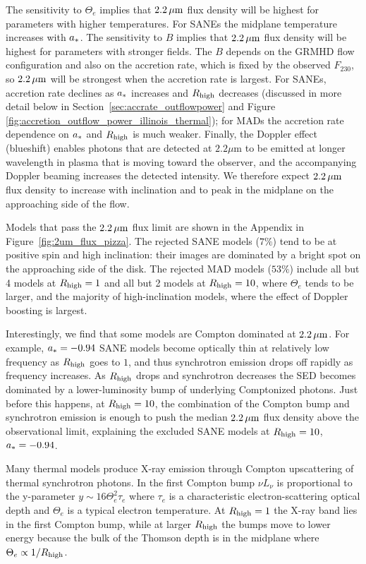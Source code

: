 The sensitivity to $\Theta_e$ implies that $2.2\,\mu\mathrm{m}$ flux density will be highest for parameters with higher temperatures.
For SANEs the midplane temperature increases with $a_*$.
The sensitivity to $B$ implies that $2.2\,\mu\mathrm{m}$ flux density will be highest for parameters with stronger fields.
The $B$ depends on the GRMHD flow configuration and also on the accretion rate, which is fixed by the observed $F_{230}$, so $2.2\,\mu\mathrm{m}$ will be strongest when the accretion rate is largest.
For SANEs, accretion rate declines as $a_*$ increases and $R_\mathrm{high}$ decreases (discussed in more detail below in  Section~\ref{sec:accrate_outflowpower} and Figure \ref{fig:accretion_outflow_power_illinois_thermal}); for MADs the accretion rate dependence on $a_*$ and $R_\mathrm{high}$ is much weaker.
Finally, the Doppler effect (blueshift) enables photons that are detected at $2.2\mu$m to be emitted at longer wavelength in plasma that is moving toward the observer, and the accompanying Doppler beaming increases the detected intensity.
We therefore expect $2.2\,\mu\mathrm{m}$ flux density to increase with inclination and to peak in the midplane on the approaching side of the flow.

Models that pass the $2.2\,\mu\mathrm{m}$ flux limit are shown in the Appendix in Figure~\ref{fig:2um_flux_pizza}.
The rejected SANE models ($7\%$) tend to be at positive spin and high inclination: their images are dominated by a bright spot on the approaching side of the disk.
The rejected MAD models ($53\%$) include all but 4 models at $R_\mathrm{high} = 1$ and all but 2 models at $R_\mathrm{high} = 10$, where $\Theta_e$ tends to be larger, and the majority of high-inclination models, where the effect of Doppler boosting is largest.

Interestingly, we find that some models are Compton dominated at $2.2\,\mu\mathrm{m}$.
For example, $a_* = -0.94$ SANE models become optically thin at relatively low frequency as $R_\mathrm{high}$ goes to $1$, and thus synchrotron emission drops off rapidly as frequency increases.
As $R_\mathrm{high}$ drops and synchrotron decreases the SED becomes dominated by a lower-luminosity bump of underlying Comptonized photons.
Just before this happens, at $R_\mathrm{high} = 10$, the combination of the Compton bump and synchrotron emission is enough to push the median $2.2\,\mu\mathrm{m}$ flux density above the observational limit, explaining the excluded SANE models at $R_\mathrm{high} = 10$, $a_* = -0.94$.


Many thermal models produce X-ray emission through Compton upscattering of thermal synchrotron photons.
In the first Compton bump $\nu L_\nu$ is proportional to the y-parameter $y \sim 16 \Theta_e^2 \tau_e$ where $\tau_e$ is a characteristic electron-scattering optical depth and $\Theta_e$ is a typical electron temperature.
At $R_\mathrm{high} = 1$ the X-ray band lies in the first Compton bump, while at larger $R_\mathrm{high}$ the bumps move to lower energy because the bulk of the Thomson depth is in the midplane where $\Theta_e \propto 1/R_\mathrm{high}$.

